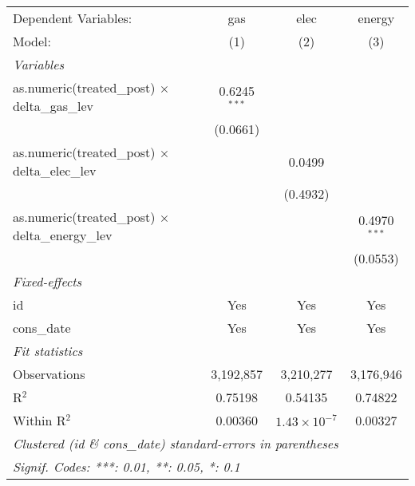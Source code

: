 
\begin{tabular}{lccc}
   \tabularnewline\midrule\midrule
   Dependent Variables:                                      & gas            & elec                  & energy\\
   Model:                                                    & (1)            & (2)                   & (3)\\
   \midrule \emph{Variables} &   &   &  \\
   as.numeric(treated\_post) $\times$ delta\_gas\_lev    & 0.6245$^{***}$ &                       &   \\
                                                             & (0.0661)       &                       &   \\
   as.numeric(treated\_post) $\times$ delta\_elec\_lev   &                & 0.0499                &   \\
                                                             &                & (0.4932)              &   \\
   as.numeric(treated\_post) $\times$ delta\_energy\_lev &                &                       & 0.4970$^{***}$\\
                                                             &                &                       & (0.0553)\\
   \midrule \emph{Fixed-effects} &   &   &  \\
   id                                                        & Yes            & Yes                   & Yes\\
   cons\_date                                               & Yes            & Yes                   & Yes\\
   \midrule \emph{Fit statistics} &   &   &  \\
   Observations                                              & 3,192,857      & 3,210,277             & 3,176,946\\
   R$^2$                                                     & 0.75198        & 0.54135               & 0.74822\\
   Within R$^2$                                              & 0.00360        & $1.43\times 10^{-7}$ & 0.00327\\
   \midrule\midrule\multicolumn{4}{l}{\emph{Clustered (id \& cons\_date) standard-errors in parentheses}}\\
   \multicolumn{4}{l}{\emph{Signif. Codes: ***: 0.01, **: 0.05, *: 0.1}}\\
\end{tabular}


